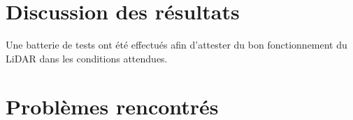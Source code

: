 \section{Discussion des résultats}

Une batterie de tests ont été effectués afin d'attester du bon fonctionnement du LiDAR dans les conditions
attendues. 

\section{Problèmes rencontrés}
